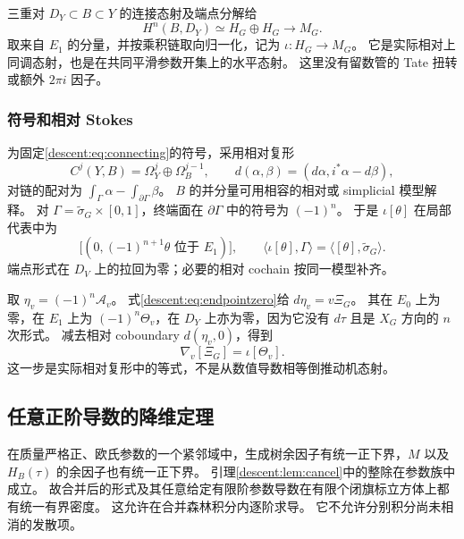 \documentclass[11pt,a4paper,oneside]{ctexart}
\theoremstyle{cnplain}
\theoremstyle{definition}
\theoremstyle{remark}
\numberwithin{equation}{section}
\begin{document}
三重对 $D_Y\subset B\subset Y$ 的连接态射及端点分解给
\begin{equation}\label{descent:eq:connecting}
 H^n(B,D_Y)\simeq H_G\oplus H_G
       \longrightarrow M_G.
\end{equation}
取来自 $E_1$ 的分量，并按乘积链取向归一化，记为 $\iota:H_G\to M_G$。
它是实际相对上同调态射，也是在共同平滑参数开集上的水平态射。
这里没有留数管的 Tate 扭转或额外 $2\pi i$ 因子。

\subsubsection{符号和相对 Stokes}
为固定\eqref{descent:eq:connecting}的符号，采用相对复形
\[
 C^j(Y,B)=\Omega_Y^j\oplus\Omega_B^{j-1},\qquad
 d(\alpha,\beta)=(d\alpha,i^*\alpha-d\beta),
\]
对链的配对为 $\int_\Gamma\alpha-\int_{\partial\Gamma}\beta$。
$B$ 的并分量可用相容的相对或 simplicial 模型解释。
对 $\Gamma=\widetilde\sigma_G\times[0,1]$，终端面在 $\partial\Gamma$ 中的符号为 $(-1)^n$。
于是 $\iota[\theta]$ 在局部代表中为
\begin{equation}\label{descent:eq:cone}
 \bigl[(0,(-1)^{n+1}\theta\text{ 位于 }E_1)\bigr],
 \qquad
 \langle\iota[\theta],\Gamma\rangle
     =\langle[\theta],\widetilde\sigma_G\rangle.
\end{equation}
端点形式在 $D_V$ 上的拉回为零；必要的相对 cochain 按同一模型补齐。

取 $\eta_v=(-1)^n\mathcal A_v$。
式\eqref{descent:eq:endpointzero}给 $d\eta_v=v\Xi_G$。
其在 $E_0$ 上为零，在 $E_1$ 上为 $(-1)^n\Theta_v$，在 $D_Y$ 上亦为零，因为它没有 $d\tau$ 且是 $X_G$ 方向的 $n$ 次形式。
减去相对 coboundary $d(\eta_v,0)$，得到
\begin{equation}\label{descent:eq:GM}
 \nabla_v[\Xi_G]=\iota[\Theta_v].
\end{equation}
这一步是实际相对复形中的等式，不是从数值导数相等倒推动机态射。


\subsection{任意正阶导数的降维定理}
在质量严格正、欧氏参数的一个紧邻域中，生成树余因子有统一正下界，$M$ 以及 $H_B(\tau)$ 的余因子也有统一正下界。
引理\ref{descent:lem:cancel}中的整除在参数族中成立。
故合并后的形式及其任意给定有限阶参数导数在有限个闭旗标立方体上都有统一有界密度。
这允许在合并森林积分内逐阶求导。
它不允许分别积分尚未相消的发散项。
\end{document}
